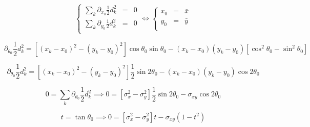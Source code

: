 \documentclass[aps,12pt]{revtex4}
\begin{document}
\begin{equation}
\left\lbrace
\begin{array}{rcl}
\sum_k\partial_{x_0} \frac{1}{2} d^2_k & = & 0\\
\sum_k\partial_{y_0} \frac{1}{2} d^2_k & = & 0\\
\end{array}
\right.
\iff
\left\lbrace
\begin{array}{rcl}
x_0 & = & \bar{x} \\
y_0 & = & \bar{y} \\
\end{array}
\right.
\end{equation}

\begin{equation}
\partial_{\theta_0} \frac{1}{2} d^2_k = \left[ (x_k-x_0)^2-(y_k-y_0)^2 \right] \cos\theta_0\sin\theta_0 - (x_k-x_0) (y_k-y_0) \left[ \cos^2\theta_0 - \sin^2\theta_0\right]
\end{equation}

\begin{equation}
\partial_{\theta_0} \frac{1}{2} d^2_k = \left[ (x_k-x_0)^2 - (y_k-y_0)^2\right] \frac{1}{2} \sin 2\theta_0 - (x_k-x_0) (y_k-y_0) \cos 2\theta_0
\end{equation}

\begin{equation}
0 = \sum_k\partial_{\theta_0} \frac{1}{2} d^2_k \implies 0 = \left[ \sigma_x^2 - \sigma_y^2 \right] \frac{1}{2} \sin 2\theta_0 - \sigma_{xy} \cos 2\theta_0
\end{equation}

\begin{equation}
t=\tan\theta_0 \implies 0 = \left[ \sigma_x^2 - \sigma_y^2 \right] t - \sigma_{xy} (1-t^2)
\end{equation}
\end{document}
